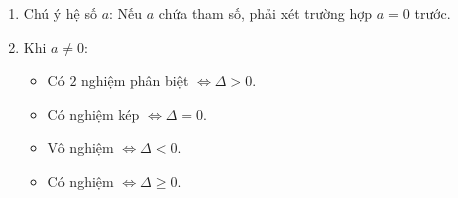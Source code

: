 \begin{enumerate}
\item Chú ý hệ số $a$: Nếu $a$ chứa tham số, phải xét trường hợp $a = 0$ trước.
\item Khi $a \ne 0$:
\begin{itemize}
\item Có $2$ nghiệm phân biệt $\iff \Delta > 0$.
\item Có nghiệm kép $\iff \Delta = 0$.
\item Vô nghiệm $\iff \Delta < 0$.
\item Có nghiệm $\iff \Delta \ge 0$.
\end{itemize}
\end{enumerate}
